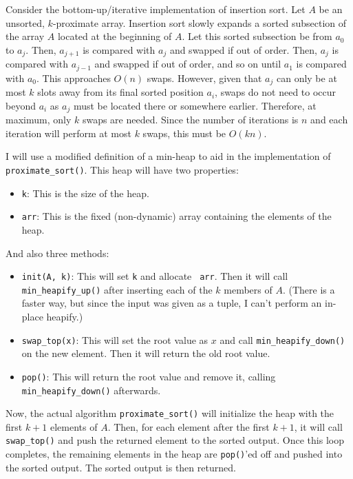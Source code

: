 \documentclass[12pt,twoside]{article}
\begin{document}
\begin{problems}
\begin{problemparts}
\end{problemparts}

\newpage
\problem

\begin{problemparts}
\problempart Consider the bottom-up/iterative implementation of insertion
    sort. Let $ A $ be an unsorted, $ k $-proximate array. Insertion sort
    slowly expands a sorted subsection of the array $ A $ located at the
    beginning of $ A $. Let this sorted subsection be from $ a_0 $ to $ a_j
    $. Then, $ a_{j + 1} $ is compared with $ a_j $ and swapped if out of
    order. Then, $ a_j $ is compared with $ a_{j - 1} $ and swapped if out of
    order, and so on until $ a_1 $ is compared with $ a_0 $. This approaches
    $ O(n) $ swaps. However, given that $ a_{j} $ can only be at most $ k $
    slots away from its final sorted position $ a_i $, swaps do not need to
    occur beyond $ a_i $ as $ a_j $ must be located there or somewhere
    earlier. Therefore, at maximum, only $ k $ swaps are needed. Since the
    number of iterations is $ n $ and each iteration will perform at most $ k
    $ swaps, this must be $ O(kn) $.

 I will use a modified definition of a min-heap
    to aid in the implementation of {\tt proximate\_sort()}. This heap will
    have two properties:
    \begin{itemize}
        \item {\tt k}: This is the size of the heap.
        \item {\tt arr}: This is the fixed (non-dynamic) array containing the
        elements of the heap.
    \end{itemize}
    And also three methods:
    \begin{itemize}
        \item {\tt init(A, k)}: This will set {\tt k} and allocate {\tt
        arr}. Then it will call {\tt min\_heapify\_up()} after inserting each
        of the $ k $ members of $ A $. (There is a faster way, but since the
        input was given as a tuple, I can't perform an in-place heapify.)
        \item {\tt swap\_top(x)}: This will set the root value as $ x $ and
        call {\tt min\_heapify\_down()} on the new element. Then it will
        return the old root value.
        \item {\tt pop()}: This will return the root value and remove it,
        calling {\tt min\_heapify\_down()} afterwards.
    \end{itemize}
    Now, the actual algorithm {\tt proximate\_sort()} will initialize the heap
    with the first $ k + 1 $ elements of $ A $. Then, for each element after
    the first $ k + 1 $, it will call {\tt swap\_top()} and push the returned
    element to the sorted output. Once this loop completes, the remaining
    elements in the heap are {\tt pop()}'ed off and pushed into the sorted
    output. The sorted output is then returned.


\end{problemparts}
\end{problems}
\end{document}
